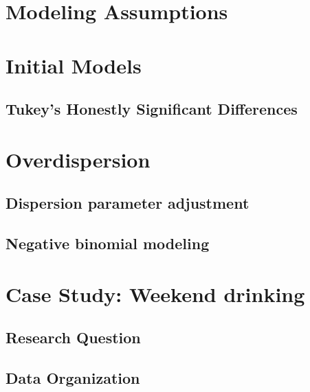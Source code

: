 \documentclass[
]{krantz}
\begin{document}
\hypertarget{modeling-assumptions}{%
\section{Modeling Assumptions}\label{modeling-assumptions}}

\hypertarget{initial-models}{%
\section{Initial Models}\label{initial-models}}

\hypertarget{tukeys-honestly-significant-differences}{%
\subsection{Tukey's Honestly Significant Differences}\label{tukeys-honestly-significant-differences}}

\hypertarget{sec-overdispPois}{%
\section{Overdispersion}\label{sec-overdispPois}}

\hypertarget{dispersion-parameter-adjustment}{%
\subsection{Dispersion parameter adjustment}\label{dispersion-parameter-adjustment}}

\hypertarget{negative-binomial-modeling}{%
\subsection{Negative binomial modeling}\label{negative-binomial-modeling}}

\hypertarget{cs:drinking}{%
\section{Case Study: Weekend drinking}\label{cs:drinking}}

\hypertarget{research-question}{%
\subsection{Research Question}\label{research-question}}

\hypertarget{data-organization-2}{%
\subsection{Data Organization}\label{data-organization-2}}
\end{document}

